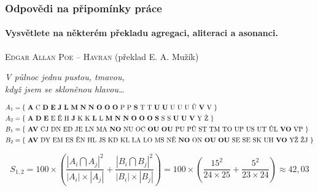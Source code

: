 \documentclass[12pt]{beamer}
\begin{document}
\begin{frame}
	\frametitle{Odpovědi na připomínky práce}
	\framesubtitle{Vysvětlete na některém překladu \textbf{agregaci}, aliteraci a asonanci.}
	\begin{center}
	
		\textsc{Edgar Allan Poe -- Havran} {\tiny (překlad E. A. Mužík)}
	
		\emph{V půlnoc jednu pustou, tmavou,\\
		když jsem se skloněnou hlavou\dots}

		\begin{tiny}
			\begin{align*}
				A_1 &= \text{\{ \textbf{A} C \textbf{D} \textbf{E}       \textbf{J}     \textbf{L}   \textbf{M} \textbf{N} \textbf{N} \textbf{O} \textbf{O} \textbf{O} P P \textbf{S} T T \textbf{U} \textbf{U} U U U Ů \textbf{V} V \}}\\
				A_2 &= \text{\{ \textbf{A}   \textbf{D} \textbf{E} E Ě H \textbf{J} K K \textbf{L} L \textbf{M} \textbf{N} \textbf{N} \textbf{O} \textbf{O} \textbf{O}     \textbf{S} S S \textbf{U} \textbf{U} \textbf{V} Y Ž \}}\\
				B_1 &= \text{\{ \textbf{AV} CJ DN ED JE LN MA                   \textbf{NO} NU OC \textbf{OU} \textbf{OU} PU PŮ ST TM TO UP US UT ŮL \textbf{VO} VP \}}\\   
				B_2 &= \text{\{ \textbf{AV} DY EM ES ĚN HL JS KD KL LA LO MS NĚ \textbf{NO} ON    \textbf{OU} \textbf{OU} SE SE SK UH \textbf{VO} YŽ ŽJ \}}
			\end{align*}
		\end{tiny}
	
		\vspace{-50pt}
		\begin{footnotesize}
		\begin{equation*}
			S_{1,2}=100 \times \left ( \frac{\left | A_i \bigcap A_j \right |^{2}}{\left | A_i \right | \times \left | A_j \right |} + \frac{\left | B_i \bigcap B_j \right |^{2}}{\left | B_i \right | \times \left | B_j \right |} \right ) = 100 \times \left ( \frac{15^{2}}{24 \times 25} + \frac{5^{2}}{23 \times 24} \right ) \approx  42,03
		\end{equation*}
		
	\end{footnotesize}

	\end{center}


\end{frame}
\end{document}
